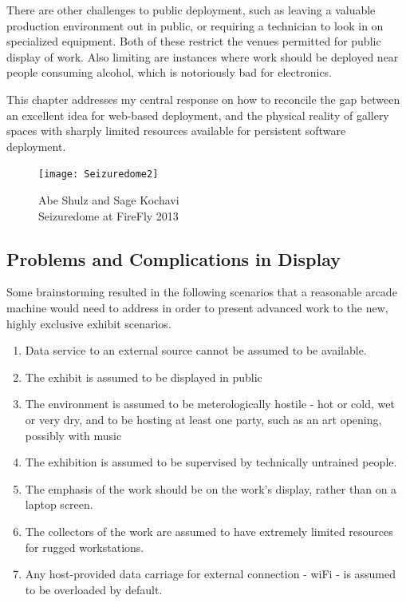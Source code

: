 There are other challenges to public deployment, such as leaving a valuable production environment out in public, or requiring a technician to look in on specialized equipment. Both of these restrict the venues permitted for public display of work. Also limiting are instances where work should be deployed near people consuming alcohol, which is notoriously bad for electronics.

This chapter addresses my central response on how to reconcile the gap between an excellent idea for web-based deployment, and the physical reality of gallery spaces with sharply limited resources available for persistent software deployment. 


\newpage
\begin{figure}[h!]
 \centering
  \texttt{[image: Seizuredome2]}
  \caption{Abe Shulz and Sage Kochavi\\Seizuredome at FireFly 2013}
\end{figure}
\clearpage

\subsection{Problems and Complications in Display}
Some brainstorming resulted in the following scenarios that a reasonable arcade machine would need to address in order to present advanced work to the new, highly exclusive exhibit scenarios. 

\begin{enumerate}
\item Data service to an external source cannot be assumed to be available. 
\item The exhibit is assumed to be displayed in public
\item The environment is assumed to be meterologically hostile - hot or cold, wet or very dry, and to be hosting at least one party, such as an art opening, possibly with music
\item The exhibition is assumed to be supervised by technically untrained people.
\item The emphasis of the work should be on the work's display, rather than on a laptop screen.
\item The collectors of the work are assumed to have extremely limited resources for rugged workstations.
\item Any host-provided data carriage for external connection - wiFi - is assumed to be overloaded by default.
\end{enumerate}

